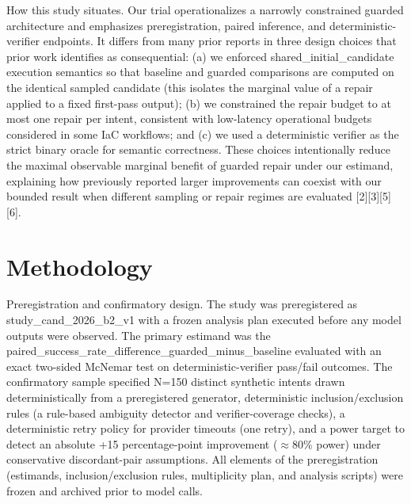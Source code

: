 \documentclass[conference]{IEEEtran}
\begin{document}
How this study situates. Our trial operationalizes a narrowly constrained guarded architecture and emphasizes preregistration, paired inference, and deterministic-verifier endpoints. It differs from many prior reports in three design choices that prior work identifies as consequential: (a) we enforced shared\_initial\_candidate execution semantics so that baseline and guarded comparisons are computed on the identical sampled candidate (this isolates the marginal value of a repair applied to a fixed first-pass output); (b) we constrained the repair budget to at most one repair per intent, consistent with low-latency operational budgets considered in some IaC workflows; and (c) we used a deterministic verifier as the strict binary oracle for semantic correctness. These choices intentionally reduce the maximal observable marginal benefit of guarded repair under our estimand, explaining how previously reported larger improvements can coexist with our bounded result when different sampling or repair regimes are evaluated [2][3][5][6].

\section{Methodology}
Preregistration and confirmatory design. The study was preregistered as study\_cand\_2026\_b2\_v1 with a frozen analysis plan executed before any model outputs were observed. The primary estimand was the paired\_success\_rate\_difference\_guarded\_minus\_baseline evaluated with an exact two-sided McNemar test on deterministic-verifier pass/fail outcomes. The confirmatory sample specified N=150 distinct synthetic intents drawn deterministically from a preregistered generator, deterministic inclusion/exclusion rules (a rule-based ambiguity detector and verifier-coverage checks), a deterministic retry policy for provider timeouts (one retry), and a power target to detect an absolute +15 percentage-point improvement (\ensuremath{\approx}80\% power) under conservative discordant-pair assumptions. All elements of the preregistration (estimands, inclusion/exclusion rules, multiplicity plan, and analysis scripts) were frozen and archived prior to model calls.
\end{document}
